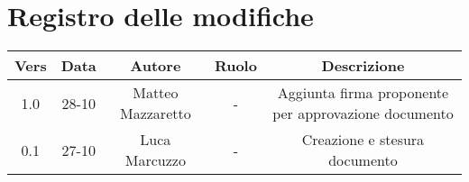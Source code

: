 \section{Registro delle modifiche}

\begin{table}[htbp]
	\begin{tabular}{|c|c|c|c|c|}
		\hline
		\rowcolor[gray]{0.9}
		Vers & Data & Autore & Ruolo & Descrizione \\
		\hline
		1.0 & 28-10 & Matteo Mazzaretto & - & Aggiunta firma proponente per approvazione documento \\
		\hline
		0.1 & 27-10 & Luca Marcuzzo & - & Creazione e stesura documento \\
		\hline
	\end{tabular}
\end{table}